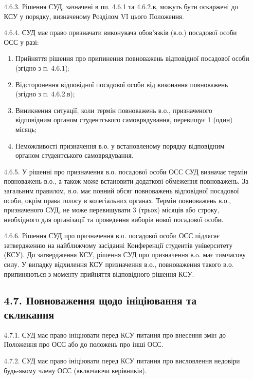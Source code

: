     4.6.3. Рішення СУД, зазначені в пп. 4.6.1 та 4.6.2.в, можуть бути оскаржені до КСУ у порядку, визначеному Розділом VI цього Положення.
    
    4.6.4. СУД має право призначати виконувача обов'язків (в.о.) посадової особи ОСС у разі:
    
        \begin{enumerate}[label=\alph*)]
            \item Прийняття рішення про припинення повноважень відповідної посадової особи (згідно з п. 4.6.1);
            \item Відсторонення відповідної посадової особи від виконання повноважень (згідно з п. 4.6.2.в);
            \item Виникнення ситуації, коли термін повноважень в.о., призначеного відповідним органом студентського самоврядування, перевищує 1 (один) місяць;
            \item Неможливості призначення в.о. у встановленому порядку відповідним органом студентського самоврядування.
        \end{enumerate}
    
    4.6.5. У рішенні про призначення в.о. посадової особи ОСС СУД визначає термін повноважень в.о., а також може встановити додаткові обмеження повноважень. За загальним правилом, в.о. має повний обсяг повноважень відповідної посадової особи, окрім права голосу в колегіальних органах. Термін повноважень в.о., призначеного СУД, не може перевищувати 3 (трьох) місяців або строку, необхідного для організації та проведення виборів нової посадової особи.
    
    4.6.6. Рішення СУД про призначення в.о. посадової особи ОСС підлягає затвердженню на найближчому засіданні Конференції студентів університету (КСУ). До затвердження КСУ, рішення СУД про призначення в.o. має тимчасову силу. У випадку відхилення КСУ призначення в.о., повноваження такого в.о. припиняються з моменту прийняття відповідного рішення КСУ.

\subsection*{4.7. Повноваження щодо ініціювання та скликання}
    4.7.1. СУД має право ініціювати перед КСУ питання про внесення змін до Положення про ОСС або до положень про інші ОСС.

    4.7.2. СУД має право ініціювати перед КСУ питання про висловлення недовіри будь-якому члену ОСС (включаючи керівників).

